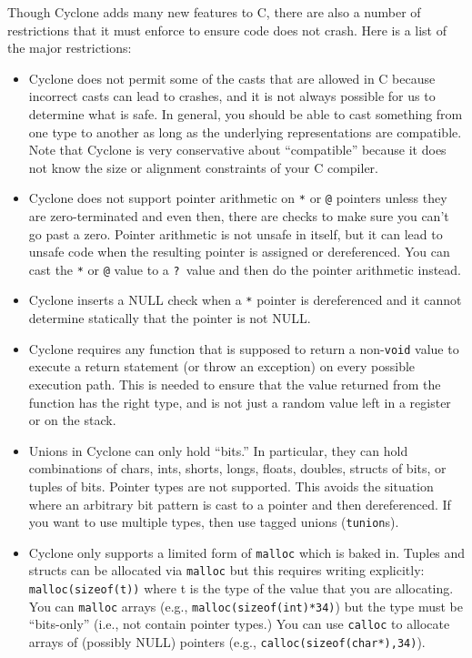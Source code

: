 Though Cyclone adds many new features to C, there are also a number
of restrictions that it must enforce to ensure code does not crash.
Here is a list of the major restrictions:
\begin{itemize}
\item Cyclone does not permit some of the casts that are allowed in C because
  incorrect casts can lead to crashes, and it is not always possible
  for us to determine what is safe.  In general, you should be
  able to cast something from one type to another as long as the
  underlying representations are compatible.  Note that Cyclone is
  very conservative about ``compatible'' because it does not know
  the size or alignment constraints of your C compiler.  

\item Cyclone does not support pointer arithmetic on \texttt{*} or
  \texttt{@} pointers unless they are zero-terminated and even then,
  there are checks to make sure you can't go past a zero.  Pointer 
  arithmetic is not unsafe in itself, but
  it can lead to unsafe code when the resulting pointer is assigned or
  dereferenced.  You can cast the \texttt{*} or \texttt{@} value to a
  \texttt{?}\ value and then do the pointer arithmetic instead.

\item Cyclone inserts a NULL check when a \texttt{*} pointer is
  dereferenced and it cannot determine statically that the pointer is
  not NULL\@.

\item Cyclone requires any function that is supposed to return a
  non-\texttt{void} value to execute a return statement (or throw an
  exception) on every possible execution path. This is needed to
  ensure that the value returned from the function has the right type,
  and is not just a random value left in a register or on the stack.

\item Unions in Cyclone can only hold ``bits.''  In particular, they
  can hold combinations of chars, ints, shorts, longs, floats,
  doubles, structs of bits, or tuples of bits. Pointer types are not
  supported.  This avoids the situation where an arbitrary bit pattern
  is cast to a pointer and then dereferenced. If you want to use
  multiple types, then use tagged unions (\texttt{tunion}s).

\item Cyclone only supports a limited form of \texttt{malloc} which is
  baked in. Tuples and structs can be allocated via \texttt{malloc}
  but this requires writing explicitly: \texttt{malloc(sizeof(t))}
  where t is the type of the value that you are allocating.  You
  can \texttt{malloc} arrays (e.g., \texttt{malloc(sizeof(int)*34)})
  but the type must be ``bits-only'' (i.e., not contain pointer types.)
  You can use \texttt{calloc} to allocate arrays of (possibly NULL)
  pointers (e.g., \texttt{calloc(sizeof(char*),34)}).  


\end{itemize}
